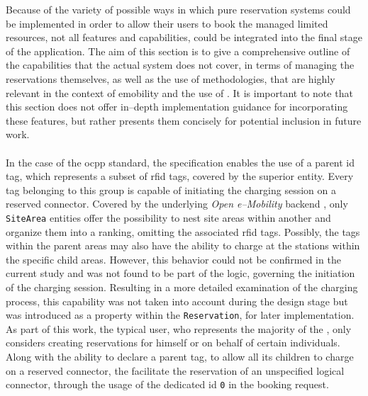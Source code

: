 Because of the variety of possible ways in which pure reservation systems could be implemented in order to allow their users to book the managed limited resources, not all features and capabilities, could be integrated into the final stage of the application.
The aim of this section is to give a comprehensive outline of the capabilities that the actual system does not cover, in terms of managing the reservations themselves, as well as the use of methodologies, that are highly relevant in the context of \acrshort{emobility} and the use of .
It is important to note that this section does not offer in--depth implementation guidance for incorporating these features, but rather presents them concisely for potential inclusion in future work. \\ \\
\noindent In the case of the \acrshort{ocpp} standard, the specification enables the use of a parent \acrshort{id} tag, which represents a subset of \acrshort{rfid} tags, covered by the superior entity. Every tag belonging to this group is capable of initiating the charging session on a reserved connector.
Covered by the underlying \textit{Open e--Mobility} backend \cite{noauthor_github_nodate-2}, only \texttt{SiteArea} entities offer the possibility to nest site areas within another and organize them into a ranking, omitting the associated \acrshort{rfid} tags.
Possibly, the tags within the parent areas may also have the ability to charge at the stations within the specific child areas. However, this behavior could not be confirmed in the current study and was not found to be part of the logic, governing the initiation of the charging session.
Resulting in a more detailed examination of the charging process, this capability was not taken into account during the design stage but was introduced as a property within the \texttt{Reservation}, for later implementation.
As part of this work, the typical user, who represents the majority of the , only considers creating reservations for himself or on behalf of certain individuals. \\ 
Along with the ability to declare a parent tag, to allow all its children to charge on a reserved connector, the  facilitate the reservation of an unspecified logical connector, through the usage of the dedicated \acrshort{id} \texttt{0} in the booking request.
